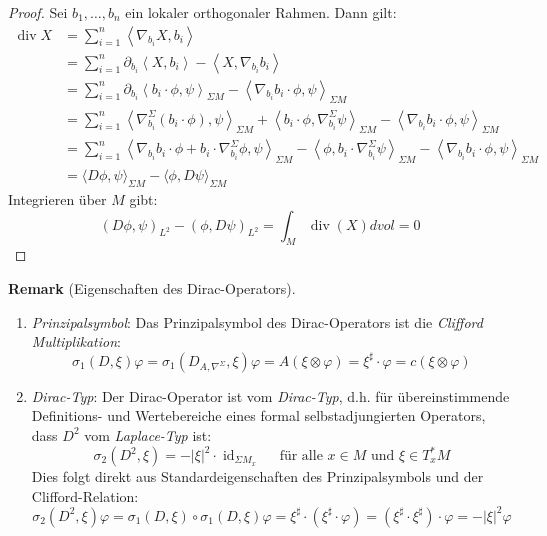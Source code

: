 \documentclass[10pt, letterpaper]{article}
\newcommand{\CustomHeading}[3]{%
  \par\medskip\noindent%
  \textbf{#1 #2} \textnormal{(#3)}.\enskip%
}
\newenvironment{REM}[2]{\CustomHeading{Remark}{#1}{#2}}{}
\begin{document}
\begin{proof}
Sei $b_1, \ldots, b_n$ ein lokaler orthogonaler Rahmen. Dann gilt:
$$
  \begin{aligned}
  \operatorname{div} X & =\sum_{i=1}^n\left\langle\nabla_{b_i} X, b_i\right\rangle \\
  & =\sum_{i=1}^n \partial_{b_i}\left\langle X, b_i\right\rangle-\left\langle X, \nabla_{b_i} b_i\right\rangle \\
  & =\sum_{i=1}^n \partial_{b_i}\left\langle b_i \cdot \phi, \psi\right\rangle_{\Sigma M}-\left\langle\nabla_{b_i} b_i \cdot \phi, \psi\right\rangle_{\Sigma M} \\
  & = \sum_{i=1}^n\left\langle\nabla_{b_i}^{\Sigma}\left(b_i \cdot \phi\right), \psi\right\rangle_{\Sigma M}+\left\langle b_i \cdot \phi, \nabla_{b_i}^{\Sigma} \psi\right\rangle_{\Sigma M}-\left\langle\nabla_{b_i} b_i \cdot \phi, \psi\right\rangle_{\Sigma M}\\
  & = \sum_{i=1}^n\left\langle\nabla_{b_i} b_i \cdot \phi+b_i \cdot \nabla_{b_i}^{\Sigma} \phi, \psi\right\rangle_{\Sigma M}-\left\langle\phi, b_i \cdot \nabla_{b_i}^{\Sigma} \psi\right\rangle_{\Sigma M}-\left\langle\nabla_{b_i} b_i \cdot \phi, \psi\right\rangle_{\Sigma M} \\ 
  & = \langle D \phi, \psi\rangle_{\Sigma M}-\langle\phi, D \psi\rangle_{\Sigma M}
  \end{aligned}
  $$
  Integrieren über $M$ gibt:
  $$
  (D \phi, \psi)_{L^2}-(\phi, D \psi)_{L^2}=\int_M \operatorname{div}(X) d v o l=0
  $$
\end{proof}

\begin{REM}{}{Eigenschaften des Dirac-Operators}
  \begin{enumerate}
    \item \emph{Prinzipalsymbol}: Das Prinzipalsymbol des Dirac-Operators ist die \emph{Clifford Multiplikation}:
    $$\sigma_1(D, \xi) \varphi=\sigma_1\left(D_{A, \nabla^{\Sigma}}, \xi\right) \varphi = A(\xi \otimes \varphi)=\xi^{\sharp} \cdot \varphi=c(\xi\otimes \varphi)$$
    \item \emph{Dirac-Typ}: Der Dirac-Operator ist vom \emph{Dirac-Typ}, d.h. für übereinstimmende Definitions- und Wertebereiche eines formal selbstadjungierten Operators, dass $D^2$ vom \emph{Laplace-Typ} ist:
    $$\sigma_2(D^2, \xi)=-|\xi|^2 \cdot \operatorname{id}_{\Sigma M_x} \quad \text{ für alle } x \in M \text{ und } \xi \in T_x^* M$$
    Dies folgt direkt aus Standardeigenschaften des Prinzipalsymbols und der Clifford-Relation:
    $$\sigma_2(D^2,\xi)\varphi=\sigma_1(D,\xi)\circ\sigma_1(D,\xi)\varphi=\xi^\sharp\cdot(\xi^\sharp\cdot \varphi)=(\xi^\sharp\cdot\xi^\sharp)\cdot \varphi=-|\xi|^2\varphi$$


    
    
  \end{enumerate}
\end{REM}
\end{document}
